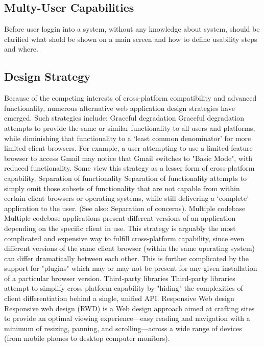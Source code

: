 \subsection {Multy-User Capabilities}
Before user loggin into a system, without any knowledge about system, should be clarified what shold be shown on a main screen and how to define usability steps and where. 

\subsection {Design Strategy}
Because of the competing interests of cross-platform compatibility and advanced functionality, numerous alternative web application design strategies have emerged. Such strategies include:
\newline
Graceful degradation
\newline
Graceful degradation attempts to provide the same or similar functionality to all users and platforms, while diminishing that functionality to a ‘least common denominator’ for more limited client browsers. For example, a user attempting to use a limited-feature browser to access Gmail may notice that Gmail switches to "Basic Mode", with reduced functionality. Some view this strategy as a lesser form of cross-platform capability.
\newline
Separation of functionality
\newline
Separation of functionality attempts to simply omit those subsets of functionality that are not capable from within certain client browsers or operating systems, while still delivering a ‘complete’ application to the user. (See also: Separation of concerns).
\newline
Multiple codebase
\newline
Multiple codebase applications present different versions of an application depending on the specific client in use. This strategy is arguably the most complicated and expensive way to fulfill cross-platform capability, since even different versions of the same client browser (within the same operating system) can differ dramatically between each other. This is further complicated by the support for "plugins" which may or may not be present for any given installation of a particular browser version.
\newline
Third-party libraries
\newline
Third-party libraries attempt to simplify cross-platform capability by "hiding" the complexities of client differentiation behind a single, unified API.
\newline
Responsive Web design
\newline
Responsive web design (RWD) is a Web design approach aimed at crafting sites to provide an optimal viewing experience—easy reading and navigation with a minimum of resizing, panning, and scrolling—across a wide range of devices (from mobile phones to desktop computer monitors).

